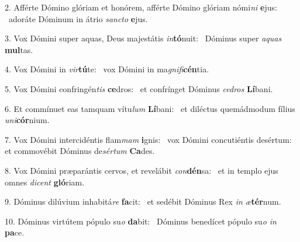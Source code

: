 2. Afférte Dómino glóriam et honórem, afférte Dómino glóriam nómi\textit{ni} \textbf{e}jus: \ast\  adoráte Dóminum in átrio \textit{sanc}\textit{to} \textbf{e}jus.\

3. Vox Dómini super aquas, Deus majestátis \textit{in}\textbf{tó}nuit: \ast\  Dóminus super \textit{a}\textit{quas} \textbf{mul}tas.\

4. Vox Dómini in \textit{vir}\textbf{tú}te: \ast\  vox Dómini in ma\textit{gni}\textit{fi}\textbf{cén}tia.\

5. Vox Dómini confringén\textit{tis} \textbf{ce}dros: \ast\  et confrínget Dóminus \textit{ce}\textit{dros} \textbf{Lí}bani.\

6. Et commínuet eas tamquam vítu\textit{lum} \textbf{Lí}bani: \ast\  et diléctus quemádmodum fílius \textit{u}\textit{ni}\textbf{cór}nium.\

7. Vox Dómini intercidéntis flam\textit{mam} \textbf{i}gnis: \ast\  vox Dómini concutiéntis desértum: et commovébit Dóminus de\textit{sér}\textit{tum} \textbf{Ca}des.\

8. Vox Dómini præparántis cervos, et revelábit \textit{con}\textbf{dén}sa: \ast\  et in templo ejus omnes \textit{di}\textit{cent} \textbf{gló}riam.\

9. Dóminus dilúvium inhabitá\textit{re} \textbf{fa}cit: \ast\  et sedébit Dóminus Rex \textit{in} \textit{æ}\textbf{tér}num.\

10. Dóminus virtútem pópulo su\textit{o} \textbf{da}bit: \ast\  Dóminus benedícet pópulo su\textit{o} \textit{in} \textbf{pa}ce.\

